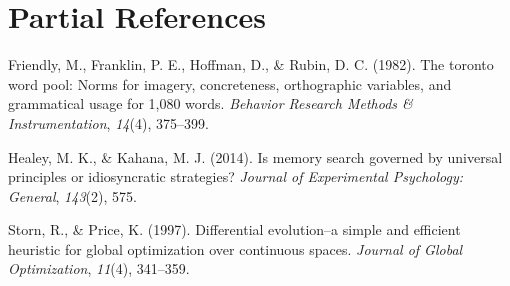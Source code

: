 \documentclass[
  man,
  longtable,
  nolmodern,
  notxfonts,
  notimes,
  draftfirst,
  colorlinks=true,linkcolor=blue,citecolor=blue,urlcolor=blue]{apa7}
\newlength{\cslhangindent}
\newenvironment{CSLReferences}[2] %
 {\begin{list}{}{%
  \setlength{\itemindent}{0pt}
  \setlength{\leftmargin}{0pt}
  \setlength{\parsep}{0pt}
  \ifodd #1
   \setlength{\leftmargin}{\cslhangindent}
   \setlength{\itemindent}{-1\cslhangindent}
  \fi
  \setlength{\itemsep}{#2\baselineskip}}}
 {\end{list}}
\begin{document}
\section{Partial References}\label{partial-references}

\label{refs}
\begin{CSLReferences}{1}{0}
Friendly, M., Franklin, P. E., Hoffman, D., \& Rubin, D. C. (1982). The
toronto word pool: Norms for imagery, concreteness, orthographic
variables, and grammatical usage for 1,080 words. \emph{Behavior
Research Methods \& Instrumentation}, \emph{14}(4), 375--399.

Healey, M. K., \& Kahana, M. J. (2014). Is memory search governed by
universal principles or idiosyncratic strategies? \emph{Journal of
Experimental Psychology: General}, \emph{143}(2), 575.

Storn, R., \& Price, K. (1997). Differential evolution--a simple and
efficient heuristic for global optimization over continuous spaces.
\emph{Journal of Global Optimization}, \emph{11}(4), 341--359.

\end{CSLReferences}
\end{document}
